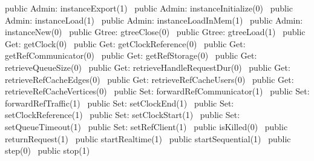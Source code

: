 public \LA{}Admin: instanceExport(1)~{\nwtagstyle{}}\RA{}
public \LA{}Admin: instanceInitialize(0)~{\nwtagstyle{}}\RA{}
public \LA{}Admin: instanceLoad(1)~{\nwtagstyle{}}\RA{}
public \LA{}Admin: instanceLoadInMem(1)~{\nwtagstyle{}}\RA{}
public \LA{}Admin: instanceNew(0)~{\nwtagstyle{}}\RA{}
public \LA{}Gtree: gtreeClose(0)~{\nwtagstyle{}}\RA{}
public \LA{}Gtree: gtreeLoad(1)~{\nwtagstyle{}}\RA{}
public \LA{}Get: getClock(0)~{\nwtagstyle{}}\RA{}
public \LA{}Get: getClockReference(0)~{\nwtagstyle{}}\RA{}
public \LA{}Get: getRefCommunicator(0)~{\nwtagstyle{}}\RA{}
public \LA{}Get: getRefStorage(0)~{\nwtagstyle{}}\RA{}
public \LA{}Get: retrieveQueueSize(0)~{\nwtagstyle{}}\RA{}
public \LA{}Get: retrieveHandleRequestDur(0)~{\nwtagstyle{}}\RA{}
public \LA{}Get: retrieveRefCacheEdges(0)~{\nwtagstyle{}}\RA{}
public \LA{}Get: retrieveRefCacheUsers(0)~{\nwtagstyle{}}\RA{}
public \LA{}Get: retrieveRefCacheVertices(0)~{\nwtagstyle{}}\RA{}
public \LA{}Set: forwardRefCommunicator(1)~{\nwtagstyle{}}\RA{}
public \LA{}Set: forwardRefTraffic(1)~{\nwtagstyle{}}\RA{}
public \LA{}Set: setClockEnd(1)~{\nwtagstyle{}}\RA{}
public \LA{}Set: setClockReference(1)~{\nwtagstyle{}}\RA{}
public \LA{}Set: setClockStart(1)~{\nwtagstyle{}}\RA{}
public \LA{}Set: setQueueTimeout(1)~{\nwtagstyle{}}\RA{}
public \LA{}Set: setRefClient(1)~{\nwtagstyle{}}\RA{}
public \LA{}isKilled(0)~{\nwtagstyle{}}\RA{}
public \LA{}returnRequest(1)~{\nwtagstyle{}}\RA{}
public \LA{}startRealtime(1)~{\nwtagstyle{}}\RA{}
public \LA{}startSequential(1)~{\nwtagstyle{}}\RA{}
public \LA{}step(0)~{\nwtagstyle{}}\RA{}
public \LA{}stop(1)~{\nwtagstyle{}}\RA{}
\nwendcode{}\nwdocspar

